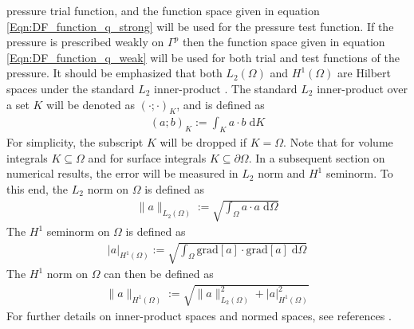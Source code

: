 \documentclass[11pt,reqno]{amsart}
\begin{document}
pressure trial function, and the function space given 
in equation \eqref{Eqn:DF_function_q_strong} will be 
used for the pressure test function. If the pressure 
is prescribed weakly on $\Gamma^{p}$ then the function 
space given in equation \eqref{Eqn:DF_function_q_weak} 
will be used for both trial and test functions of the 
pressure.
It should be emphasized that both $L_2(\Omega)$ and 
$H^1(\Omega)$ are Hilbert spaces under the standard 
$L_2$ inner-product \cite{Evans_PDE}. The standard 
$L_2$ inner-product over a set $K$ will be denoted 
as $(\cdot;\cdot)_{K}$, and is defined as
\begin{align}
  (a;b)_K := \int_{K} a \cdot b \; \mathrm{d} K
\end{align}
For simplicity, the subscript $K$ will be dropped 
if $K = \Omega$. Note that for volume integrals 
$K \subseteq \Omega$ and for surface integrals 
$K \subseteq \partial \Omega$. In a subsequent 
section on numerical results, the error will be 
measured in $L_2$ norm and $H^1$ seminorm. To 
this end, the $L_2$ norm on $\Omega$ is defined 
as 
\begin{align}
  \|a\|_{L_2(\Omega)} := \sqrt{\int_{\Omega} 
    a \cdot a \; \mathrm{d} \Omega}
\end{align}
The $H^1$ seminorm on $\Omega$ is defined as
\begin{align}
  |a|_{H^1(\Omega)} := \sqrt{\int_{\Omega} 
    \mathrm{grad}[a] \cdot \mathrm{grad}[a] 
    \; \mathrm{d} \Omega}
\end{align}
The $H^1$ norm on $\Omega$ can then be defined as 
\begin{align}
  \|a\|_{H^1(\Omega)} := \sqrt{\|a\|_{L_2(\Omega)}^2 
    + |a|^2_{H^1(\Omega)}}
\end{align}
For further details on inner-product spaces and normed 
spaces, see references \cite{Reddy_Functional_Analysis,
Oden_Demkowicz}.
\end{document}
